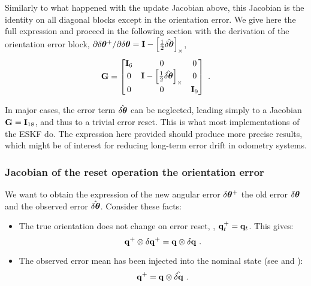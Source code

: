 {Similarly to what happened with the update Jacobian above, this Jacobian is the identity on all diagonal blocks except in the orientation error. 
We give here the full expression and proceed in the following section with the derivation of the orientation error block, $\partial\delta{\bm \theta}^+/\partial\delta{\bm \theta} = {\bf I} - \left[\frac12\hat{\delta{\bm \theta}}\right]_\times$,
%
\begin{equation}
{\bf G} = \begin{bmatrix}
{\bf I}_6 & 0 & 0 \\
0 & {\bf I} - \left[\frac12\hat{\delta{\bm \theta}}\right]_\times & 0 \\
0 & 0 & {\bf I}_9
\end{bmatrix}~.
\end{equation}

In major cases, the error term $\hat{\delta{\bm \theta}}$ can be neglected, leading simply to a Jacobian ${\bf G}={\bf I}_{18}$, and thus to a trivial error reset. 
This is what most implementations of the ESKF do.
The expression here provided should produce more precise results, which might be of interest for reducing long-term error drift in odometry systems.


\subsubsection{Jacobian of the reset operation \wrt the orientation error}

We want to obtain the expression of the new angular error $\delta{\bm \theta}^+$ \wrt the old error $\delta{\bm \theta}$ and the observed error $\hat{\delta{\bm \theta}}$. Consider these facts:
\begin{itemize}
\item
The true orientation does not change on error reset, \ie, ${\bf q}_t^+ = {\bf q}_t$. This gives:
%
\begin{equation}
{\bf q}^+\otimes\delta{\bf q}^+ = {\bf q}\otimes \delta{\bf q}~.
\end{equation}
%
\item
The observed error mean has been injected into the nominal state (see  and ):
%
\begin{equation}
{\bf q}^+ = {\bf q}\otimes \hat{\delta{\bf q}}~.
\end{equation}
\end{itemize}

}
